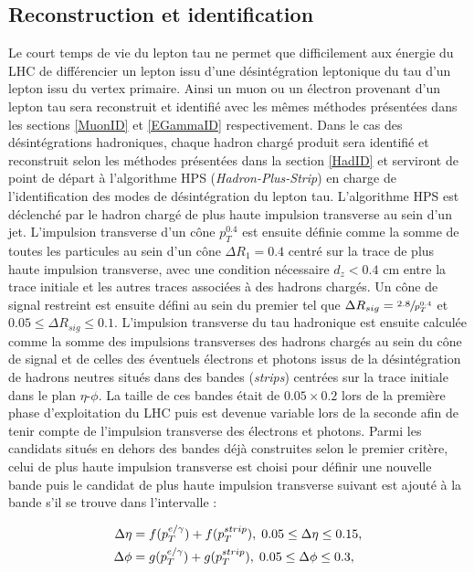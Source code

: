 \subsection{Reconstruction et identification}
\label{TauID}

Le court temps de vie du lepton tau ne permet que difficilement aux énergie du LHC de différencier un lepton issu d'une désintégration leptonique du tau d'un lepton issu du vertex primaire. Ainsi un muon ou un électron provenant d'un lepton tau sera reconstruit et identifié avec les mêmes méthodes présentées dans les sections \ref{MuonID} et \ref{EGammaID} respectivement. Dans le cas des désintégrations hadroniques, chaque hadron chargé produit sera identifié et reconstruit selon les méthodes présentées dans la section \ref{HadID} et serviront de point de départ à l'algorithme HPS (\textit{Hadron-Plus-Strip}) en charge de l'identification des modes de désintégration du lepton tau. L'algorithme HPS est déclenché par le hadron chargé de plus haute impulsion transverse au sein d'un jet. L'impulsion transverse d'un cône $p_T^{0.4}$ est ensuite définie comme la somme de toutes les particules au sein d'un cône $\Delta R_1 = 0.4$ centré sur la trace de plus haute impulsion transverse, avec une condition nécessaire $d_z<0.4$ cm entre la trace initiale et les autres traces associées à des hadrons chargés. Un cône de signal restreint est ensuite défini au sein du premier tel que $\Delta R_{sig} = \sfrac{2.8}{p_T^{0.4}}$ et $0.05\leq\Delta R_{sig}\leq 0.1$. L'impulsion transverse du tau hadronique est ensuite calculée comme la somme des impulsions transverses des hadrons chargés au sein du cône de signal et de celles des éventuels électrons et photons issus de la désintégration de hadrons neutres situés dans des bandes (\textit{strips}) centrées sur la trace initiale dans le plan $\eta$-$\phi$. La taille de ces bandes était de $0.05\times0.2$ lors de la première phase d'exploitation du LHC puis est devenue variable lors de la seconde afin de tenir compte de l'impulsion transverse des électrons et photons. Parmi les candidats situés en dehors des bandes déjà construites selon le premier critère, celui de plus haute impulsion transverse est choisi pour définir une nouvelle bande puis le candidat de plus haute impulsion transverse suivant est ajouté à la bande s'il se trouve dans l'intervalle :

\begin{align*}
    \Delta\eta & = f(p_T^{e/\gamma}) + f(p_T^{strip}),\; 0.05\leq\Delta\eta\leq0.15, \\
    \Delta\phi & = g(p_T^{e/\gamma}) + g(p_T^{strip}),\; 0.05\leq\Delta\phi\leq0.3,
    \vspace{5pt} 
\end{align*}

